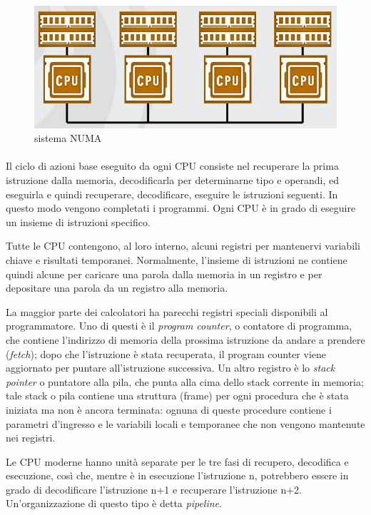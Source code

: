 \begin{figure}[!ht]
    \centering
    \includegraphics[width=0.7\linewidth]{assets/numa1.png}
    \caption{sistema NUMA}
\end{figure}

\paragraph*{}
Il ciclo di azioni base eseguito da ogni CPU consiste nel recuperare la prima istruzione dalla memoria, decodificarla per determinarne tipo e operandi, ed eseguirla e quindi recuperare, decodificare, eseguire le istruzioni seguenti. In questo modo vengono completati i programmi. Ogni CPU è in grado di eseguire un insieme di istruzioni specifico.

Tutte le CPU contengono, al loro interno, alcuni registri per mantenervi variabili chiave e risultati temporanei. Normalmente, l'insieme di istruzioni ne contiene quindi alcune per caricare una parola dalla memoria in un registro e per depositare una parola da un registro alla memoria.

La maggior parte dei calcolatori ha parecchi registri speciali disponibili al programmatore. Uno di questi è il \textit{program counter}, o contatore di programma, che contiene l'indirizzo di memoria della prossima istruzione da andare a prendere (\textit{fetch}); dopo che l'istruzione è stata recuperata, il program counter viene aggiornato per puntare all'istruzione successiva. 
Un altro registro è lo \textit{stack pointer} o puntatore alla pila, che punta alla cima dello stack corrente in memoria; tale stack o pila contiene una struttura (frame) per ogni procedura che è stata iniziata ma non è ancora terminata: ognuna di queste procedure contiene i parametri d'ingresso e le variabili locali e temporanee che non vengono mantenute nei registri.

Le CPU moderne hanno unità separate per le tre fasi di recupero, decodifica e esecuzione, così che, mentre è in esecuzione l'istruzione n, potrebbero essere in grado di decodificare l'istruzione n+1 e recuperare l'istruzione n+2. Un'organizzazione di questo tipo è detta \textit{pipeline}.

